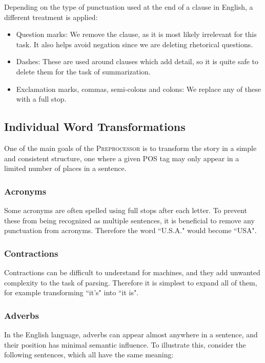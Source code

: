 Depending on the type of punctuation used at the end of a clause in English, a different treatment is applied:
\begin{itemize}[nolistsep]
\item Question marks: We remove the clause, as it is most likely irrelevant for this task. It also helps avoid negation since we are deleting rhetorical questions.
\item Dashes: These are used around clauses which add detail, so it is quite safe to delete them for the task of summarization.
\item Exclamation marks, commas, semi-colons and colons: We replace any of these with a full stop.
\end{itemize}

\subsection{Individual Word Transformations}

One of the main goals of the \textsc{Preprocessor} is to transform the story in a simple and consistent structure, one where a given POS tag may only appear in a limited number of places in a sentence.

\subsubsection{Acronyms}

Some acronyms are often spelled using full stops after each letter. To prevent these from being recognized as multiple sentences, it is beneficial to remove any punctuation from acronyms. Therefore the word ``U.S.A." would become ``USA".

\subsubsection{Contractions}

Contractions can be difficult to understand for machines, and they add unwanted complexity to the task of parsing. Therefore it is simplest to expand all of them, for example transforming ``it's" into ``it is".

\subsubsection{Adverbs}

In the English language, adverbs can appear almost anywhere in a sentence, and their position has minimal semantic influence. To illustrate this, consider the following sentences, which all have the same meaning:

